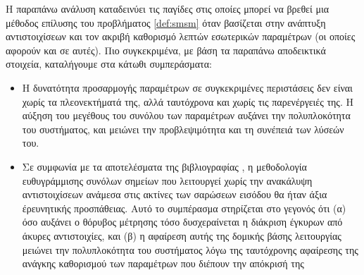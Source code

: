 Η παραπάνω ανάλυση καταδεινύει τις παγίδες στις οποίες μπορεί να βρεθεί μια
μέθοδος επίλυσης του προβλήματος \ref{def:smsm} όταν βασίζεται στην ανάπτυξη
αντιστοιχίσεων και τον ακριβή καθορισμό λεπτών εσωτερικών παραμέτρων (οι οποίες
αφορούν και σε αυτές). Πιο συγκεκριμένα, με βάση τα παραπάνω αποδεικτικά
στοιχεία, καταλήγουμε στα κάτωθι συμπεράσματα:

\begin{itemize}
  \item Η δυνατότητα προσαρμογής παραμέτρων σε συγκεκριμένες περιστάσεις δεν
        είναι χωρίς τα πλεονεκτήματά της, αλλά ταυτόχρονα και χωρίς τις
        παρενέργειές της. Η αύξηση του μεγέθους του συνόλου των παραμέτρων
        αυξάνει την πολυπλοκότητα του συστήματος, και μειώνει την προβλεψιμότητα
        και τη συνέπειά των λύσεών του.

  \item Σε συμφωνία με τα αποτελέσματα της βιβλιογραφίας
        \cite{Donoso2017b,bernreiter2021phaser}, η μεθοδολογία ευθυγράμμισης
        συνόλων σημείων που λειτουργεί χωρίς την ανακάλυψη αντιστοιχίσεων
        ανάμεσα στις ακτίνες των σαρώσεων εισόδου θα ήταν άξια έρευνητικής
        προσπάθειας.  Αυτό το συμπέρασμα στηρίζεται στο γεγονός ότι (α) όσο
        αυξάνει ο θόρυβος μέτρησης τόσο δυσχεραίνεται η διάκριση έγκυρων από
        άκυρες αντιστοιχίες, και (β) η αφαίρεση αυτής της δομικής βάσης
        λειτουργίας μειώνει την πολυπλοκότητα του συστήματος λόγω της
        ταυτόχρονης αφαίρεσης της ανάγκης καθορισμού των παραμέτρων που διέπουν
        την απόκρισή της
\end{itemize}
